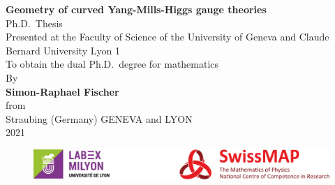 \documentclass[a4paper,twoside,11pt]{scrbook}
\theoremstyle{plain}
\theoremstyle{remark}
\theoremstyle{definition}
\newcommand{\fullname}{Simon-Raphael Fischer}
\newcommand{\jahr}{2021}
\begin{document}
\begin{titlepage}
\vfill\vfill
\begin{center}
{\Large \textbf{Geometry of curved Yang-Mills-Higgs gauge theories}}\\
\vspace{1.6cm}
{\large Ph.D.~Thesis}\\
\vspace{.3cm}
Presented at the Faculty of Science of the University of Geneva and Claude Bernard University Lyon 1\\
To obtain the dual Ph.D.~degree for mathematics\\
\vspace{1.4cm}
By\\
\vspace{.3cm}
{\large \textbf{Simon-Raphael Fischer}}\\
\vspace{.3cm}
from\\
\vspace{.3cm}
Straubing (Germany)
\vfill\vfill
GENEVA and LYON\\
\jahr
\end{center}
\vfill
\begin{figure}[H]
	\centering
	
	\includegraphics[width=1\textwidth]{bilder/Logo-LABEX_MILYON.jpg}
\end{figure}

\clearpage
\thispagestyle{empty}






\end{titlepage}
\end{document}
